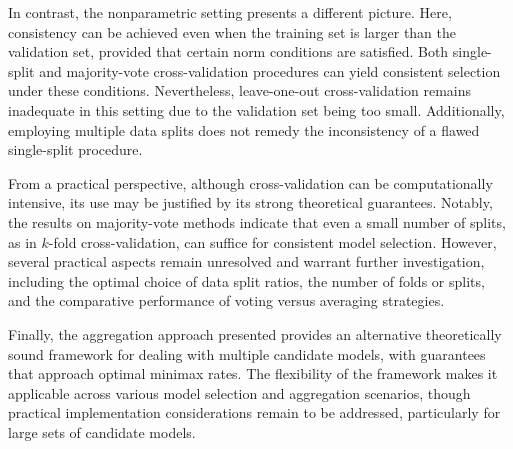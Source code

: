 \documentclass[11pt, letter paper]{article}
\newcommand{\1}{\mathmybb{1}}
\newcommand{\0}{\emptyset}
\begin{document}
In contrast, the nonparametric setting presents a different picture. Here, consistency can be achieved even when the training set is larger than the validation set, provided that certain norm conditions are satisfied. Both single-split and majority-vote cross-validation procedures can yield consistent selection under these conditions. Nevertheless, leave-one-out cross-validation remains inadequate in this setting due to the validation set being too small. Additionally, employing multiple data splits does not remedy the inconsistency of a flawed single-split procedure.

From a practical perspective, although cross-validation can be computationally intensive, its use may be justified by its strong theoretical guarantees. Notably, the results on majority-vote methods indicate that even a small number of splits, as in \(k\)-fold cross-validation, can suffice for consistent model selection. However, several practical aspects remain unresolved and warrant further investigation, including the optimal choice of data split ratios, the number of folds or splits, and the comparative performance of voting versus averaging strategies.

Finally, the aggregation approach presented provides an alternative theoretically sound framework for dealing with multiple candidate models, with guarantees that approach optimal minimax rates. The flexibility of the framework makes it applicable across various model selection and aggregation scenarios, though practical implementation considerations remain to be addressed, particularly for large sets of candidate models.

\newpage
\printbibliography{}
\end{document}
